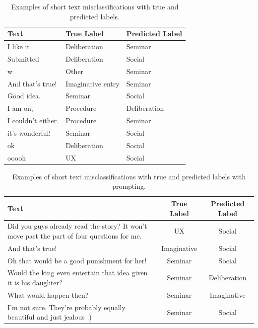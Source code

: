 \documentclass[fleqn,moreauthors,10pt]{ds_report}
\begin{document}
\begin{table}[ht!]
\caption{Examples of short text misclassifications with true and predicted labels.}
\begin{adjustbox}{width=\columnwidth,center}
\centering
\begin{tabular}{|p{5cm}|p{3cm}|p{3cm}|}
\hline
\textbf{Text} & \textbf{True Label} & \textbf{Predicted Label} \\
\hline
I like it & Deliberation & Seminar \\
Submitted & Deliberation & Social \\
w & Other & Seminar \\
And that's true! & Imaginative entry & Seminar \\
Good idea. & Seminar & Social \\
I am on, & Procedure & Deliberation \\
I couldn't either. & Procedure & Seminar \\
it's wonderful! & Seminar & Social \\
ok & Deliberation & Social \\
ooooh & UX & Social \\
\hline
\end{tabular}
\label{tab:classification_examples}
\end{adjustbox}
\end{table} 

\begin{table}[ht!]
\caption{Examples of short text misclassifications with true and predicted labels with prompting.}
\begin{adjustbox}{width=\columnwidth,center}
\centering
\begin{tabular}{|p{5cm}|c|c|}
\hline
\textbf{Text} & \textbf{True Label} & \textbf{Predicted Label} \\
\hline
Did you guys already read the story? It won't move past the part of four questions for me. & UX & Social \\
And that's true! & Imaginative & Social \\ 
Oh that would be a good punishment for her! & Seminar & Social \\ 
Would the king even entertain that idea given it is his daughter? & Seminar & Deliberation \\ 
What would happen then? & Seminar & Imaginative \\ 
I'm not sure. They're probably equally beautiful and just jealous :) & Seminar & Social \\ \hline
\end{tabular}
\label{table:misclassifications_prompt}
\end{adjustbox}
\end{table} 
\end{document}
